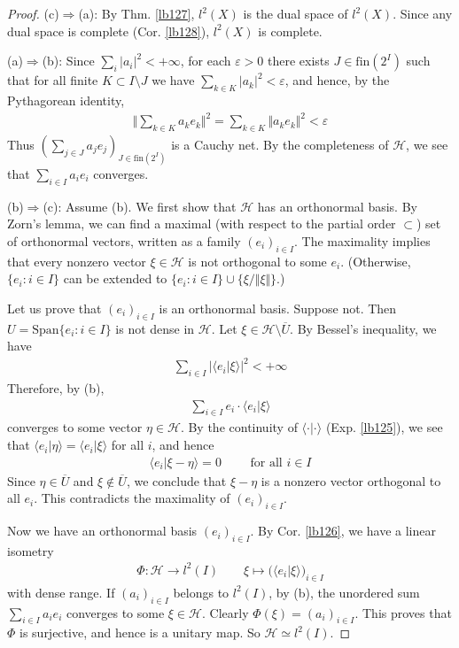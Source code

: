 \documentclass[12pt,b5paper,notitlepage]{article}
\theoremstyle{definition}
\theoremstyle{plain}
\newcommand{\ovl}{\overline}
\newcommand{\Span}{\mathrm{Span}}
\newcommand{\bk}[1]{\langle {#1}\rangle}
\newcommand{\fin}{\mathrm{fin}}
\newcommand{\eps}{\varepsilon}
\newcommand{\MH}{\mathcal H}
\numberwithin{equation}{section}
\begin{document}
\begin{proof}
(c)$\Rightarrow$(a): By Thm. \ref{lb127}, $l^2(X)$ is the dual space of $l^2(X)$. Since any dual space is complete (Cor. \ref{lb128}), $l^2(X)$ is complete.

(a)$\Rightarrow$(b): Since $\sum_i |a_i|^2<+\infty$, for each $\eps>0$ there exists $J\in\fin(2^I)$ such that for all finite $K\subset I\setminus J$ we have $\sum_{k\in K}|a_k|^2<\eps$, and hence, by the Pythagorean identity,
\begin{align*}
\Big\Vert \sum_{k\in K}a_ke_k\Big\Vert^2=\sum_{k\in K}\Vert a_ke_k\Vert^2<\eps
\end{align*}
Thus $(\sum_{j\in J}a_je_j)_{J\in\fin(2^I)}$ is a Cauchy net. By the completeness of $\MH$, we see that $\sum_{i\in I}a_ie_i$ converges.

(b)$\Rightarrow$(c): Assume (b). We first show that $\MH$ has an orthonormal basis. By Zorn's lemma, we can find a maximal (with respect to the partial order $\subset$) set of orthonormal vectors, written as a family $(e_i)_{i\in I}$. The maximality implies that every nonzero vector $\xi\in \MH$ is not orthogonal to some $e_i$. (Otherwise, $\{e_i:i\in I\}$ can be extended to $\{e_i:i\in I\}\cup\{\xi/\Vert\xi\Vert\}$.)

Let us prove that $(e_i)_{i\in I}$ is an orthonormal basis. Suppose not. Then $U=\Span\{e_i:i\in I\}$ is not dense in $\MH$. Let $\xi\in \MH\setminus \ovl{U}$. By Bessel's inequality, we have
\begin{align*}
\sum_{i\in I}|\bk{e_i|\xi}|^2<+\infty
\end{align*}
Therefore, by (b),
\begin{align}
\sum_{i\in I}e_i\cdot\bk{e_i|\xi}
\end{align}
converges to some vector $\eta\in \MH$. By the continuity of $\bk{\cdot|\cdot}$ (Exp. \ref{lb125}), we see that $\bk{e_i|\eta}=\bk{e_i|\xi}$ for all $i$, and hence
\begin{align}\label{eq74}
\bk{e_i|\xi-\eta}=0\qquad\text{ for all }i\in I
\end{align}
Since $\eta\in\ovl U$ and $\xi\notin\ovl U$, we conclude that $\xi-\eta$ is a nonzero vector orthogonal to all $e_i$. This contradicts the maximality of $(e_i)_{i\in I}$.

Now we have an orthonormal basis $(e_i)_{i\in I}$. By Cor. \ref{lb126}, we have a linear isometry
\begin{align*}
\Phi:\MH\rightarrow l^2(I)\qquad \xi\mapsto \big(\bk{e_i|\xi}\big)_{i\in I}
\end{align*}
with dense range. If $(a_i)_{i\in I}$ belongs to $l^2(I)$, by (b), the unordered sum $\sum_{i\in I}a_ie_i$ converges to some $\xi\in \MH$. Clearly $\Phi(\xi)=(a_i)_{i\in I}$. This proves that $\Phi$ is surjective, and hence is a unitary map. So $\MH\simeq l^2(I)$.
\end{proof}
\end{document}
